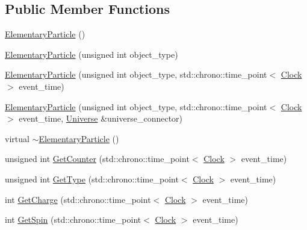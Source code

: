 \subsection*{Public Member Functions}
\begin{DoxyCompactItemize}
\item 
\mbox{\hyperlink{class_elementary_particle_a4035ffd6ce053ea3390632fa530c6e21}{Elementary\+Particle}} ()
\item 
\mbox{\hyperlink{class_elementary_particle_a6bd3ad699e15769c1860e3068020a824}{Elementary\+Particle}} (unsigned int object\+\_\+type)
\item 
\mbox{\hyperlink{class_elementary_particle_a371e2742ab8b5ce0fe55ef4adbaed3af}{Elementary\+Particle}} (unsigned int object\+\_\+type, std\+::chrono\+::time\+\_\+point$<$ \mbox{\hyperlink{universe_8h_a0ef8d951d1ca5ab3cfaf7ab4c7a6fd80}{Clock}} $>$ event\+\_\+time)
\item 
\mbox{\hyperlink{class_elementary_particle_a0b43033247b36096d0de2a7553c620a9}{Elementary\+Particle}} (unsigned int object\+\_\+type, std\+::chrono\+::time\+\_\+point$<$ \mbox{\hyperlink{universe_8h_a0ef8d951d1ca5ab3cfaf7ab4c7a6fd80}{Clock}} $>$ event\+\_\+time, \mbox{\hyperlink{class_universe}{Universe}} \&universe\+\_\+connector)
\item 
virtual \mbox{\hyperlink{class_elementary_particle_a5adce47bf88a5381c88a4d40f87fe76f}{$\sim$\+Elementary\+Particle}} ()
\item 
unsigned int \mbox{\hyperlink{class_elementary_particle_a371b9b9bc520047c42d9e6d06b7f3dd9}{Get\+Counter}} (std\+::chrono\+::time\+\_\+point$<$ \mbox{\hyperlink{universe_8h_a0ef8d951d1ca5ab3cfaf7ab4c7a6fd80}{Clock}} $>$ event\+\_\+time)
\item 
unsigned int \mbox{\hyperlink{class_elementary_particle_a63fe7df86d2fba4a64a69dfa5757e94e}{Get\+Type}} (std\+::chrono\+::time\+\_\+point$<$ \mbox{\hyperlink{universe_8h_a0ef8d951d1ca5ab3cfaf7ab4c7a6fd80}{Clock}} $>$ event\+\_\+time)
\item 
int \mbox{\hyperlink{class_elementary_particle_af3ebb984cfe957b2e76463c22e4b5bb5}{Get\+Charge}} (std\+::chrono\+::time\+\_\+point$<$ \mbox{\hyperlink{universe_8h_a0ef8d951d1ca5ab3cfaf7ab4c7a6fd80}{Clock}} $>$ event\+\_\+time)
\item 
int \mbox{\hyperlink{class_elementary_particle_ad5f5a05770f94f4c8fee418d59098126}{Get\+Spin}} (std\+::chrono\+::time\+\_\+point$<$ \mbox{\hyperlink{universe_8h_a0ef8d951d1ca5ab3cfaf7ab4c7a6fd80}{Clock}} $>$ event\+\_\+time)
\item 

\end{DoxyCompactItemize}
